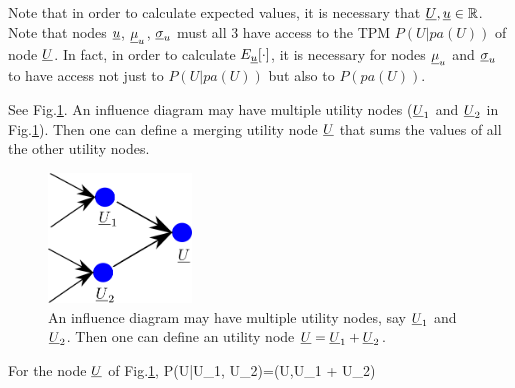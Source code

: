 Note that in order to
calculate expected values,
it is necessary that
${\underline{U}}, {\underline{u}}\in { \mathbb{R}}$. Note that
nodes ${\underline{u}}$, $\underline{\mu}_u$, $\underline{\sigma}_u$
must all 3 have access
to the 
TPM
$P(U|pa(U))$ of node ${\underline{U}}$.
In fact, in order  to
calculate $E_{\underline{u}}[\cdot]$,
it is necessary for
nodes $\underline{\mu}_u$ and 
 $\underline{\sigma}_u$
to have access not just to 
$P(U|pa(U))$ but also to
$P(pa(U))$.

See Fig.\ref{fig-util-merge}.
An influence
diagram may have multiple
utility nodes (${\underline{U}}_1$ and
${\underline{U}}_2$ in Fig.\ref{fig-util-merge}).
Then one can define a merging
utility node ${\underline{U}}$ that sums
the values of
all the other utility 
nodes.

\begin{figure}[h!]
\centering
\includegraphics[width=1.5in]
{inf-dia/util-merge.png}
\caption{An influence
diagram may have multiple
utility nodes, say ${\underline{U}}_1$ and
${\underline{U}}_2$. Then
one can define an
utility node ${\underline{U}}={\underline{U}}_1 + {\underline{U}}_2$. } 
\label{fig-util-merge}
\end{figure}

For the node ${\underline{U}}$ of 
Fig.\ref{fig-util-merge},
\beq\color{blue}
P(U|U_1, U_2)=\delta(U,U_1 + U_2)
\eeq